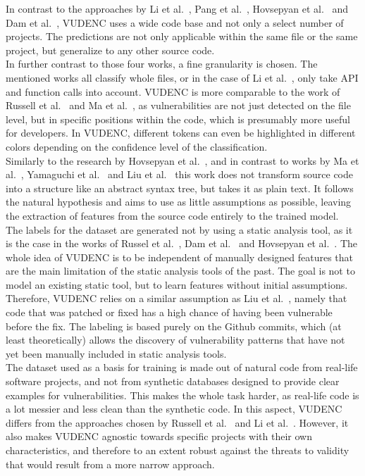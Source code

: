 \documentclass[
a4paper,
pagesize,
pdftex,
12pt,
twoside, %
BCOR=5mm, %
ngerman,
fleqn,
final,
]{scrartcl}
\begin{document}
	In contrast to the approaches by Li et al.~\cite{Li.2018}, Pang et al.~\cite{Pang.2015}, Hovsepyan et al.~\cite{Hovsepyan.2012} and Dam et al.~\cite{Dam.2017}, VUDENC uses a wide code base and not only a select number of projects. The predictions are not only applicable within the same file or the same project, but generalize to any other source code.\\
	In further contrast to those four works, a fine granularity is chosen. The mentioned works all classify whole files, or in the case of Li et al.~\cite{Li.2018}, only take API and function calls into account. VUDENC is more comparable to the work of Russell et al.~\cite{Russell.2018} and Ma et al.~\cite{Ma.2017}, as vulnerabilities are not just detected on the file level, but in specific positions within the code, which is presumably more useful for developers. In VUDENC, different tokens can even be highlighted in different colors depending on the confidence level of the classification.\\
	Similarly to the research by Hovsepyan et al.~\cite{Hovsepyan.2012}, and in contrast to works by Ma et al.~\cite{Ma.2017}, Yamaguchi et al.~\cite{Yamaguchi.2012} and Liu et al.~\cite{Liu.2018}
	this work does not transform source code into a structure like an abstract syntax tree, but takes it as plain text. It follows the natural hypothesis and aims to use as little assumptions as possible, leaving the extraction of features from the source code entirely to the trained model.\\
	The labels for the dataset are generated not by using a static analysis tool, as it is the case in the works of Russel et al.~\cite{Russell.2018}, Dam et al.~\cite{Dam.2017} and Hovsepyan et al.~\cite{Hovsepyan.2012}. The whole idea of VUDENC is to be independent of manually designed features that are the main limitation of the static analysis tools of the past. The goal is not to model an existing static tool, but to learn features without initial assumptions. Therefore, VUDENC relies on a similar assumption as Liu et al.~\cite{Liu.2018}, namely that code that was patched or fixed has a high chance of having been vulnerable before the fix. The labeling is based purely on the Github commits, which (at least theoretically) allows the discovery of vulnerability patterns that have not yet been manually included in static analysis tools.\\
	The dataset used as a basis for training is made out of natural code from real-life software projects, and not from synthetic databases designed to provide clear examples for vulnerabilities. This makes the whole task harder, as real-life code is a lot messier and less clean than the synthetic code. In this aspect, VUDENC differs from the approaches chosen by Russell et al.~\cite{Russell.2018} and Li et al.~\cite{Li.2018}. However, it also makes VUDENC agnostic towards specific projects with their own characteristics, and therefore to an extent robust against the threats to validity that would result from a more narrow approach.\\
\end{document}
